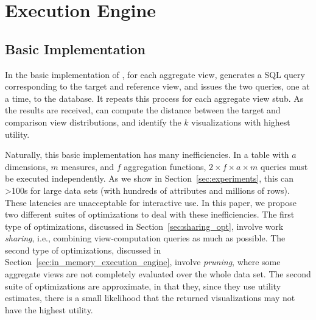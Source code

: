 \section{\SeeDB Execution Engine}
\label{sec:optimizer}

\subsection{Basic Implementation}
\label{sec:basic_implementation}

In the basic implementation of \SeeDB, for each aggregate view, \SeeDB generates
a SQL query corresponding to the target
and reference view, and issues
the two queries, one at a time, to the database.
It repeats this process for each aggregate view stub.
As the results are received, \SeeDB can compute the
distance between the target and comparison view
distributions, and identify the $k$ visualizations
with highest utility. 

Naturally, this basic implementation has many inefficiencies.
In a table with $a$ dimensions, $m$ measures, and $f$ aggregation functions, 
$2\times f \times a \times  m$ queries must be executed independently.  
As we show in Section~\ref{sec:experiments}, this can >100s for
large data sets (with hundreds of attributes and millions of rows).
These latencies are unacceptable for interactive use.
In this paper, we propose two different suites of optimizations to deal with these
inefficiencies.
The first type of optimizations, discussed in Section~\ref{sec:sharing_opt}, involve work {\em sharing},
i.e., combining view-computation queries as much as possible.
The second type of optimizations, discussed in Section~\ref{sec:in_memory_execution_engine}, involve {\em pruning}, where some aggregate views are not completely evaluated over the whole data set.
 The second suite of optimizations
are approximate, in that they, since they use utility estimates, there is a small likelihood that the returned visualizations may not have the highest utility.


